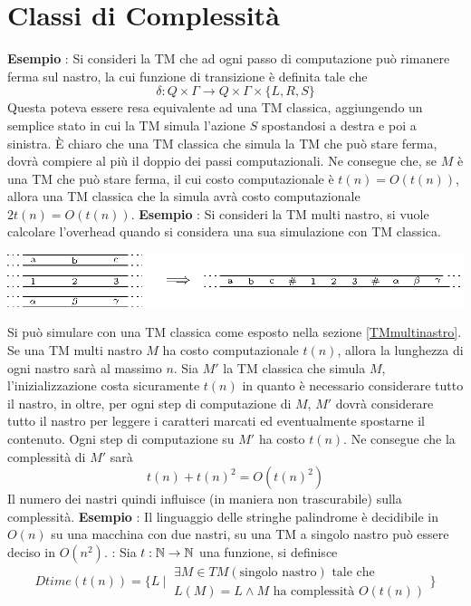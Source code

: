 \documentclass[10pt, letterpaper]{report}
\begin{document}
\section{Classi di Complessità}
\textbf{Esempio} : Si consideri la TM che ad ogni passo di computazione può rimanere ferma sul nastro, la cui funzione di transizione è definita tale che 
$$ \delta:Q\times\Gamma \rightarrow Q\times\Gamma\times \{L,R,S\}$$
Questa poteva essere resa equivalente ad una TM classica, aggiungendo un semplice stato in cui la TM simula l'azione $S$ spostandosi a destra e poi a sinistra. È chiaro che una TM classica che simula la TM che può stare ferma, dovrà compiere al più il doppio dei passi computazionali.\acc 
Ne consegue che, se $M$ è una TM che può stare ferma, il cui costo computazionale è $t(n)=O(t(n))$, allora una TM classica che la simula avrà costo computazionale $2t(n)=O(t(n))$.\acc 
\textbf{Esempio} : Si consideri la TM multi nastro, si vuole calcolare l'overhead quando si considera una sua simulazione con TM classica. \begin{center}
    \includegraphics[width=\textwidth ]{images/multinastro.eps}
\end{center}
Si può simulare con una TM classica come esposto nella sezione \ref{TMmultinastro}. Se una TM multi nastro $M$ ha costo computazionale $t(n)$, allora la lunghezza di ogni nastro sarà al massimo $n$. Sia $M'$ la TM classica che simula $M$, l'inizializzazione costa sicuramente $t(n)$ in quanto è necessario considerare tutto il nastro, in oltre, per ogni step di computazione di $M$, $M'$ dovrà considerare tutto il nastro per leggere i caratteri marcati ed eventualmente spostarne il contenuto. Ogni step di computazione su $M'$ ha costo $t(n)$. Ne consegue che la complessità di $M'$ sarà 
$$t(n)+t(n)^2 = O(t(n)^2)$$ Il numero dei nastri quindi influisce (in maniera non trascurabile) sulla complessità.\acc 
\textbf{Esempio} : Il linguaggio delle stringhe palindrome è decidibile in $O(n)$ su una macchina con due nastri, su una TM a singolo nastro può essere deciso in $O(n^2)$.\acc 
{} : Sia $t:{\mathbb N}\rightarrow {\mathbb N}$ una funzione, si definisce 
$$ Dtime(t(n))=\Bigg\{L \ |\ \begin{matrix}\exists M \in TM(\text{singolo nastro}) \text{ tale che }\\ L(M)=L\land M\text{ ha complessità }O(t(n))\end{matrix}\Bigg\}$$
\end{document}
